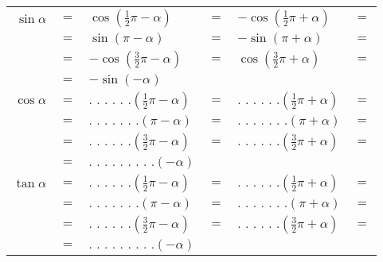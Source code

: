 \begin{minipage}{.7\textwidth}
\begin{center}
\begin{tabular}{rclclc}
\(\sin \alpha\) & \(=\) & \(\cos \left(\frac{1}{2}\pi-\alpha \right)\) 
              & \(=\) & \(-\cos \left(\frac{1}{2}\pi+\alpha \right)\) & \(=\)\\
              & \(=\) & \(\sin \left(\pi-\alpha \right)\)  
              & \(=\) & \(-\sin \left(\pi+\alpha \right)\) & \(=\) \\
              & \(=\) & \(-\cos \left(\frac{3}{2}\pi-\alpha \right)\)  
              & \(=\) & \(\cos \left(\frac{3}{2}\pi+\alpha \right)\) & \(=\) \\
              & \(=\) & \(-\sin \left(-\alpha \right)\) \\
\(\cos \alpha\) & \(=\) & \(\text{. . . . . .}
                       \left(\frac{1}{2}\pi-\alpha \right)\) 
              & \(=\) & \(\text{. . . . . .}
                       \left(\frac{1}{2}\pi+\alpha \right)\) & \(=\)\\
              & \(=\) & \(\text{. . . . . . .}
                       \left(\pi-\alpha \right)\)  
              & \(=\) & \(\text{. . . . . . .}
                       \left(\pi+\alpha \right)\) & \(=\) \\
              & \(=\) & \(\text{. . . . . .}
                       \left(\frac{3}{2}\pi-\alpha \right)\)  
              & \(=\) & \(\text{. . . . . .}
                       \left(\frac{3}{2}\pi+\alpha \right)\) & \(=\) \\
              & \(=\) & \(\text{. . . . . . . . .}
                       \left(-\alpha \right)\) \\
\(\tan \alpha\) & \(=\) & \(\text{. . . . . .}
                       \left(\frac{1}{2}\pi-\alpha \right)\) 
              & \(=\) & \(\text{. . . . . .}
                       \left(\frac{1}{2}\pi+\alpha \right)\) & \(=\)\\
              & \(=\) & \(\text{. . . . . . .}
                       \left(\pi-\alpha \right)\)  
              & \(=\) & \(\text{. . . . . . .}
                       \left(\pi+\alpha \right)\) & \(=\) \\
              & \(=\) & \(\text{. . . . . .}
                       \left(\frac{3}{2}\pi-\alpha \right)\)  
              & \(=\) & \(\text{. . . . . .}
                       \left(\frac{3}{2}\pi+\alpha \right)\) & \(=\) \\
              & \(=\) & \(\text{. . . . . . . . .}
                       \left(-\alpha \right)\) 
\end{tabular}
\end{center}
\end{minipage}

